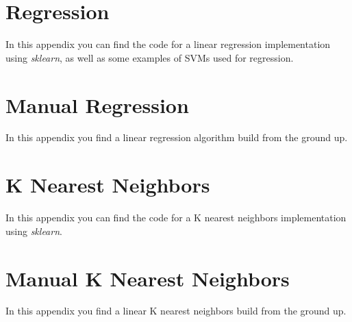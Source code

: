\chapter{Regression}\label{code:regression}

In this appendix you can find the code for a linear regression implementation using \emph{sklearn}, as well as some examples of SVMs used for regression.


\chapter{Manual Regression}\label{code:manualregression}
In this appendix you find a linear regression algorithm build from the ground up.


\chapter{K Nearest Neighbors}\label{code:knn}
In this appendix you can find the code for a K nearest neighbors implementation using \emph{sklearn}.


\chapter{Manual K Nearest Neighbors}\label{code:mknn}
In this appendix you find a linear K nearest neighbors build from the ground up.




